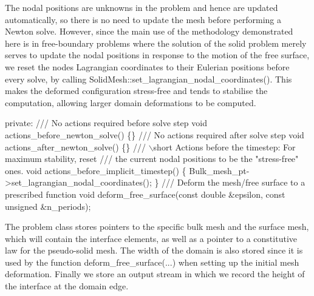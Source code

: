 The nodal positions are unknowns in the problem and hence are updated automatically, so there is no need to update the mesh before performing a Newton solve. However, since the main use of the methodology demonstrated here is in free-\/boundary problems where the solution of the solid problem merely serves to update the nodal positions in response to the motion of the free surface, we reset the nodes\textquotesingle{} Lagrangian coordinates to their Eulerian positions before every solve, by calling {\ttfamily Solid\+Mesh\+::set\+\_\+lagrangian\+\_\+nodal\+\_\+coordinates()}. This makes the deformed configuration stress-\/free and tends to stabilise the computation, allowing larger domain deformations to be computed.


\begin{DoxyCodeInclude}
\textcolor{keyword}{private}:
\textcolor{comment}{}
\textcolor{comment}{ /// No actions required before solve step}
\textcolor{comment}{} \textcolor{keywordtype}{void} actions\_before\_newton\_solve() \{\}
\textcolor{comment}{}
\textcolor{comment}{ /// No actions required after solve step}
\textcolor{comment}{} \textcolor{keywordtype}{void} actions\_after\_newton\_solve() \{\}
\textcolor{comment}{}
\textcolor{comment}{ /// \(\backslash\)short Actions before the timestep: For maximum stability, reset}
\textcolor{comment}{ /// the current nodal positions to be the "stress-free" ones.}
\textcolor{comment}{} \textcolor{keywordtype}{void} actions\_before\_implicit\_timestep()
  \{
   Bulk\_mesh\_pt->set\_lagrangian\_nodal\_coordinates();
  \}
\textcolor{comment}{}
\textcolor{comment}{ /// Deform the mesh/free surface to a prescribed function}
\textcolor{comment}{} \textcolor{keywordtype}{void} deform\_free\_surface(\textcolor{keyword}{const} \textcolor{keywordtype}{double} &epsilon, \textcolor{keyword}{const} \textcolor{keywordtype}{unsigned} &n\_periods);

\end{DoxyCodeInclude}


The problem class stores pointers to the specific bulk mesh and the surface mesh, which will contain the interface elements, as well as a pointer to a constitutive law for the pseudo-\/solid mesh. The width of the domain is also stored since it is used by the function {\ttfamily deform\+\_\+free\+\_\+surface}(...) when setting up the initial mesh deformation. Finally we store an output stream in which we record the height of the interface at the domain edge.


